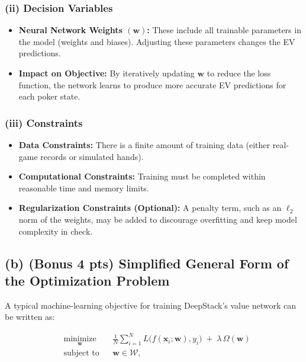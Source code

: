 \documentclass[12pt]{article}
\begin{document}
\subsubsection*{(ii) Decision Variables}

\begin{itemize}
    \item \textbf{Neural Network Weights $(\mathbf{w})$:} 
    These include all trainable parameters in the model (weights and biases). Adjusting these parameters changes the EV predictions. 
    
    \item \textbf{Impact on Objective:} 
    By iteratively updating $\mathbf{w}$ to reduce the loss function, the network learns to produce more accurate EV predictions for each poker state.
\end{itemize}

\subsubsection*{(iii) Constraints}

\begin{itemize}
    \item \textbf{Data Constraints:} There is a finite amount of training data (either real-game records or simulated hands).
    
    \item \textbf{Computational Constraints:} Training must be completed within reasonable time and memory limits.
    
    \item \textbf{Regularization Constraints (Optional):} 
    A penalty term, such as an $\ell_2$ norm of the weights, may be added to discourage overfitting and keep model complexity in check.
\end{itemize}

\subsection*{(b) (Bonus 4 pts) Simplified General Form of the Optimization Problem}

A typical machine-learning objective for training DeepStack’s value network can be written as:

\[
\begin{aligned}
& \underset{\mathbf{w}}{\text{minimize}} 
&& \frac{1}{N} \sum_{i=1}^{N} L\bigl(f(\mathbf{x}_i; \mathbf{w}), y_i \bigr) \;+\; \lambda \, \Omega(\mathbf{w}) \\
& \text{subject to} 
&& \mathbf{w} \in \mathcal{W},
\end{aligned}
\]
\end{document}
